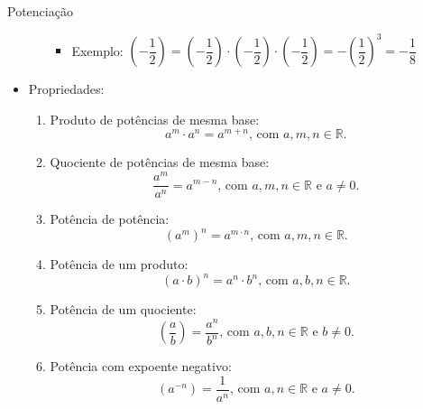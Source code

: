 \documentclass[14pt, aspectratio=169]{beamer}
\newcommand{\R}{\mathbb{R}}
\newcommand{\skipframe}{\vspace{10.0cm}}
\begin{document}
\begin{frame}[allowframebreaks]{Potenciação}
\begin{itemize}
\begin{enumerate}[a]
        \begin{itemize}
            \item Exemplo: $\left( -\dfrac{1}{2} \right) = \left( -\dfrac{1}{2} \right) \cdot \left( -\dfrac{1}{2} \right) \cdot \left( -\dfrac{1}{2} \right) = - \left(\dfrac{1}{2} \right)^3 = - \dfrac{1}{8}$
        \end{itemize}
    \end{enumerate}

    \skipframe

    \item Propriedades:

    \begin{enumerate}[a]
        \item Produto de potências de mesma base:
            \begin{equation*}
                a^m \cdot a^n = a^{m + n} \text{, com } a,m,n \in \R.
            \end{equation*}
            
        \item Quociente de potências de mesma base:
        \begin{equation*}
        \label{p2}
            \dfrac{a^m}{a^n} = a^{m - n} \text{, com } a,m,n \in \R \text{ e } a \neq 0. 
        \end{equation*}

        \skipframe

        \item Potência de potência:
        \begin{equation*}
            \left( a^m \right)^n = a^{m \cdot n} \text{, com } a,m,n \in \R.
        \end{equation*}

        \item Potência de um produto:
        \begin{equation*}
            \left( a \cdot b \right)^n = a^n \cdot b^n \text{, com } a,b,n \in \R.
        \end{equation*}

        \skipframe

        \item Potência de um quociente:
        \begin{equation*}
            \left( \dfrac{a}{b} \right) = \dfrac{a^n}{b^n} \text{, com } a,b,n \in \R \text{ e } b \neq 0.
        \end{equation*}

        \item Potência com expoente negativo:
        \begin{equation*}
            \left( a^{-n} \right) = \dfrac{1}{a^n} \text{, com } a,n \in \R \text{ e } a \neq 0.
        \end{equation*}


\end{enumerate}
\end{itemize}
\end{frame}
\end{document}

